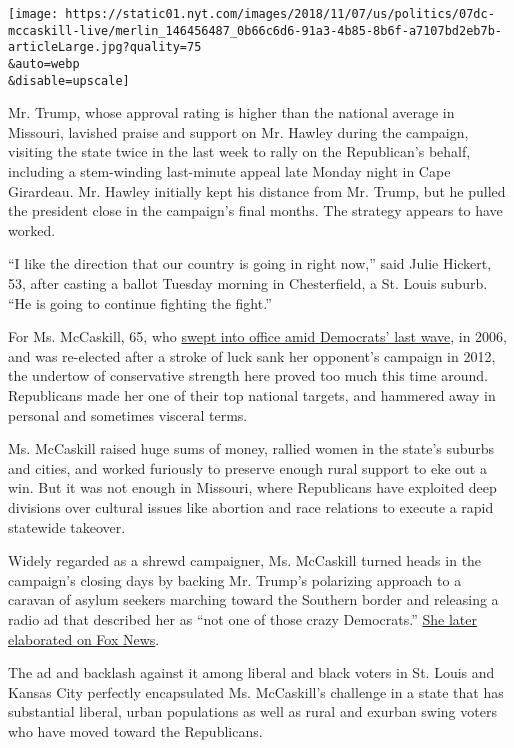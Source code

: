 \texttt{[image: https://static01.nyt.com/images/2018/11/07/us/politics/07dc-mccaskill-live/merlin\_146456487\_0b66c6d6-91a3-4b85-8b6f-a7107bd2eb7b-articleLarge.jpg?quality=75\\\&auto=webp\\\&disable=upscale]}

Mr. Trump, whose approval rating is higher than the national average in
Missouri, lavished praise and support on Mr. Hawley during the campaign,
visiting the state twice in the last week to rally on the Republican's
behalf, including a stem-winding last-minute appeal late Monday night in
Cape Girardeau. Mr. Hawley initially kept his distance from Mr. Trump,
but he pulled the president close in the campaign's final months. The
strategy appears to have worked.

``I like the direction that our country is going in right now,'' said
Julie Hickert, 53, after casting a ballot Tuesday morning in
Chesterfield, a St. Louis suburb. ``He is going to continue fighting the
fight.''

For Ms. McCaskill, 65, who
\href{https://www.nytimes.com/2006/11/08/us/politics/08missouri.html}{swept
into office amid Democrats' last wave}, in 2006, and was re-elected
after a stroke of luck sank her opponent's campaign in 2012, the
undertow of conservative strength here proved too much this time around.
Republicans made her one of their top national targets, and hammered
away in personal and sometimes visceral terms.

Ms. McCaskill raised huge sums of money, rallied women in the state's
suburbs and cities, and worked furiously to preserve enough rural
support to eke out a win. But it was not enough in Missouri, where
Republicans have exploited deep divisions over cultural issues like
abortion and race relations to execute a rapid statewide takeover.

Widely regarded as a shrewd campaigner, Ms. McCaskill turned heads in
the campaign's closing days by backing Mr. Trump's polarizing approach
to a caravan of asylum seekers marching toward the Southern border and
releasing a radio ad that described her as ``not one of those crazy
Democrats.''
\href{https://www.nytimes.com/2018/10/30/us/politics/claire-mccaskill-crazy-democrats.html}{She
later elaborated on Fox News}.

The ad and backlash against it among liberal and black voters in St.
Louis and Kansas City perfectly encapsulated Ms. McCaskill's challenge
in a state that has substantial liberal, urban populations as well as
rural and exurban swing voters who have moved toward the Republicans.

